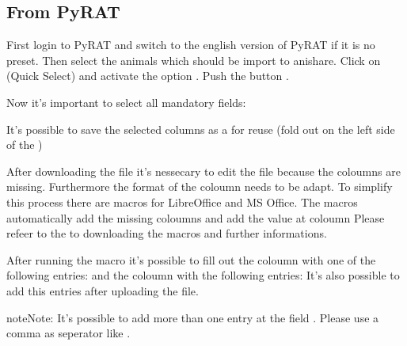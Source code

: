 \documentclass[letterpaper,10pt,openany,oneside,english]{sphinxmanual}
\begin{document}
\subsection{From PyRAT}
\label{\detokenize{index:id2}}
First login to PyRAT and switch to the english version of PyRAT if it is no preset. Then select the animals which
should be import to anishare. Click on  (Quick Select) and activate the option .
Push the button .

Now it’s important to select all mandatory fields:

\noindent{}

It’s possible to save the selected columns as a  for reuse (fold out  on the left side of the )

After downloading the file it’s nessecary to edit the file because the coloumns  are missing.
Furthermore the format of the coloumn  needs to be adapt.
To simplify this process there are macros for LibreOffice and MS Office. The macros automatically add the missing coloumns and add the value
 at coloumn 
Please refeer to the  to downloading the macros and further informations.

After running the macro it’s possible to fill out the coloumn  with one of the following entries:
 and
the coloumn  with the following entries:
It’s also possible to add this entries after uploading the file.

\begin{sphinxadmonition}{note}{Note:}
It’s possible to add more than one entry at the field . Please use a comma as seperator like .
\end{sphinxadmonition}
\end{document}
